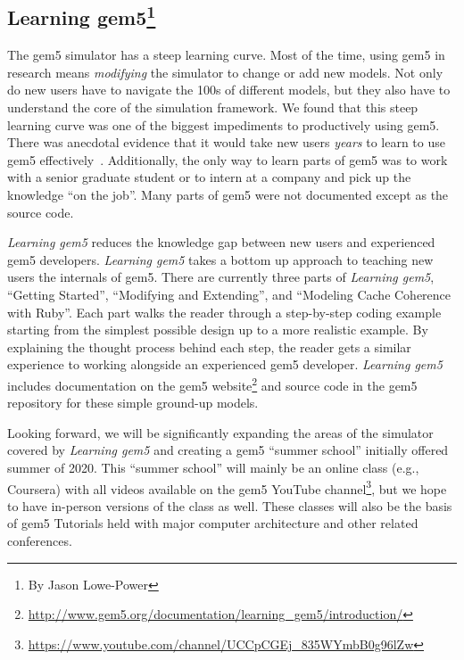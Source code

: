 \subsection[Learning gem5]{Learning gem5\footnote{By Jason Lowe-Power}}
\label{sec:learning}

The gem5 simulator has a steep learning curve.
Most of the time, using gem5 in research means \emph{modifying} the simulator to change or add new models.
Not only do new users have to navigate the 100s of different models, but they also have to understand the core of the simulation framework.
We found that this steep learning curve was one of the biggest impediments to productively using gem5.
There was anecdotal evidence that it would take new users \emph{years} to learn to use gem5 effectively~\cite{Power-gem5horrors-2015}.
Additionally, the only way to learn parts of gem5 was to work with a senior graduate student or to intern at a company and pick up the knowledge ``on the job''.
Many parts of gem5 were not documented except as the source code.

\emph{Learning gem5} reduces the knowledge gap between new users and experienced gem5 developers.
\emph{Learning gem5} takes a bottom up approach to teaching new users the internals of gem5.
There are currently three parts of \emph{Learning gem5}, ``Getting Started'', ``Modifying and Extending'', and ``Modeling Cache Coherence with Ruby''.
Each part walks the reader through a step-by-step coding example starting from the simplest possible design up to a more realistic example.
By explaining the thought process behind each step, the reader gets a similar experience to working alongside an experienced gem5 developer.
\emph{Learning gem5} includes documentation on the gem5 website\footnote{\url{http://www.gem5.org/documentation/learning_gem5/introduction/}} and source code in the gem5 repository for these simple ground-up models.

Looking forward, we will be significantly expanding the areas of the simulator covered by \emph{Learning gem5} and creating a gem5 ``summer school'' initially offered summer of 2020.
This ``summer school'' will mainly be an online class (e.g., Coursera) with all videos available on the gem5 YouTube channel\footnote{\url{https://www.youtube.com/channel/UCCpCGEj_835WYmbB0g96lZw}}, but we hope to have in-person versions of the class as well.
These classes will also be the basis of gem5 Tutorials held with major computer architecture and other related conferences.
